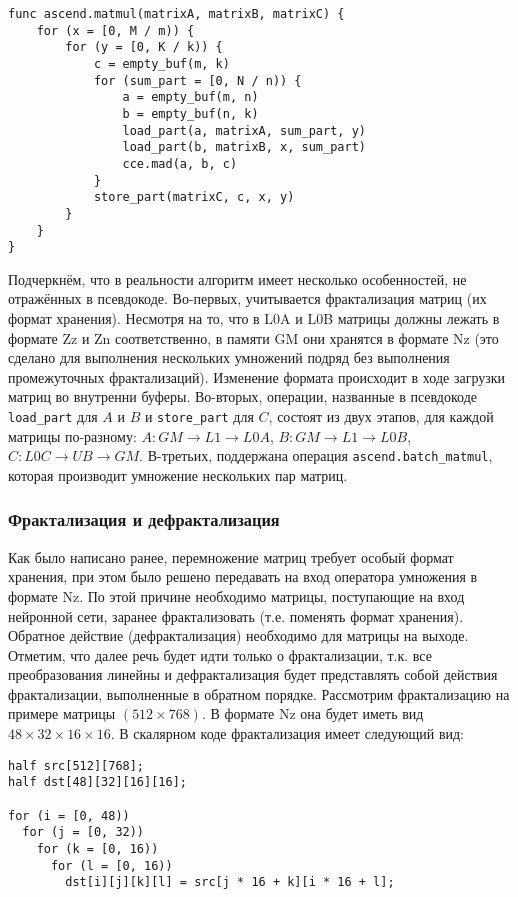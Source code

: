 \begin{lstlisting}[caption={Алгоритм умножения матриц}]
func ascend.matmul(matrixA, matrixB, matrixC) {
    for (x = [0, M / m)) {
        for (y = [0, K / k)) {
            c = empty_buf(m, k)
            for (sum_part = [0, N / n)) {
                a = empty_buf(m, n)
                b = empty_buf(n, k)
                load_part(a, matrixA, sum_part, y)
                load_part(b, matrixB, x, sum_part)
                cce.mad(a, b, c)
            }
            store_part(matrixC, c, x, y)
        }
    }
}
\end{lstlisting}

Подчеркнём, что в реальности алгоритм имеет несколько особенностей, не
отражённых в псевдокоде. Во-первых, учитывается фрактализация матриц (их формат
хранения). Несмотря на то, что в L0A и L0B матрицы должны лежать в формате Zz и Zn
соответственно, в памяти GM они хранятся в формате Nz (это сделано для выполнения
нескольких умножений подряд без выполнения промежуточных фрактализаций). Изменение
формата происходит в ходе загрузки матриц во внутренни буферы. Во-вторых,
операции, названные в псевдокоде \texttt{load\_part} для $A$ и $B$ и \texttt{store\_part}
для $C$, состоят из двух этапов, для каждой матрицы по-разному:
$A: GM \rightarrow L1 \rightarrow L0A$, $B: GM \rightarrow L1 \rightarrow L0B$,
$C: L0C \rightarrow UB \rightarrow GM$. В-третьих, поддержана операция
\texttt{ascend.batch\_matmul}, которая производит умножение нескольких пар матриц.

\subsubsection{Фрактализация и дефрактализация}

Как было написано ранее, перемножение матриц требует особый формат хранения,
при этом было решено передавать на вход оператора умножения в формате Nz.
По этой причине необходимо матрицы, поступающие на вход нейронной сети, заранее
фрактализовать (т.е. поменять формат хранения). Обратное действие
(дефрактализация) необходимо для матрицы на выходе. Отметим, что далее речь
будет идти только о фрактализации, т.к. все преобразования линейны и
дефрактализация будет представлять собой действия фрактализации, выполненные в
обратном порядке. Рассмотрим фрактализацию на примере матрицы
$(512 \times 768)$. В формате Nz она будет иметь вид
$48 \times 32 \times 16 \times 16$. В скалярном коде фрактализация имеет
следующий вид:

\begin{lstlisting}[caption={Скалярный код фрактализации}]
half src[512][768];
half dst[48][32][16][16];

for (i = [0, 48))
  for (j = [0, 32))
    for (k = [0, 16))
      for (l = [0, 16))
        dst[i][j][k][l] = src[j * 16 + k][i * 16 + l];
\end{lstlisting}

